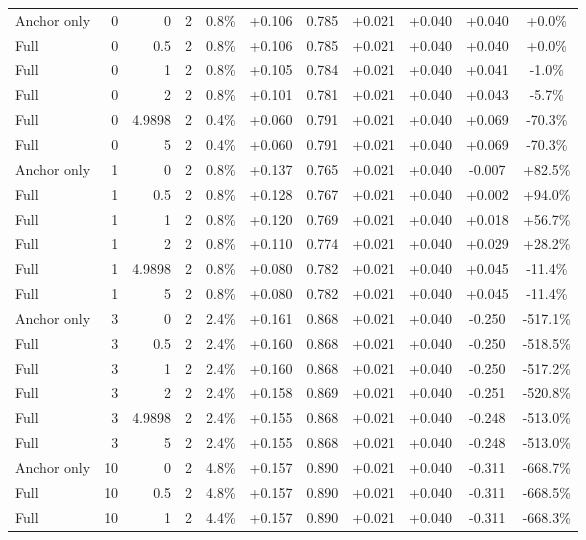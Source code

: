\begin{table}[htbp]
\begin{tabular}{lrrrccccccc}
Anchor only & 0 & 0 & 2 & 0.8\% & +0.106 & 0.785 & +0.021 & +0.040 & +0.040 & +0.0\% \\
Full & 0 & 0.5 & 2 & 0.8\% & +0.106 & 0.785 & +0.021 & +0.040 & +0.040 & +0.0\% \\
Full & 0 & 1 & 2 & 0.8\% & +0.105 & 0.784 & +0.021 & +0.040 & +0.041 & -1.0\% \\
Full & 0 & 2 & 2 & 0.8\% & +0.101 & 0.781 & +0.021 & +0.040 & +0.043 & -5.7\% \\
Full & 0 & 4.9898 & 2 & 0.4\% & +0.060 & 0.791 & +0.021 & +0.040 & +0.069 & -70.3\% \\
Full & 0 & 5 & 2 & 0.4\% & +0.060 & 0.791 & +0.021 & +0.040 & +0.069 & -70.3\% \\
Anchor only & 1 & 0 & 2 & 0.8\% & +0.137 & 0.765 & +0.021 & +0.040 & -0.007 & +82.5\% \\
Full & 1 & 0.5 & 2 & 0.8\% & +0.128 & 0.767 & +0.021 & +0.040 & +0.002 & +94.0\% \\
Full & 1 & 1 & 2 & 0.8\% & +0.120 & 0.769 & +0.021 & +0.040 & +0.018 & +56.7\% \\
Full & 1 & 2 & 2 & 0.8\% & +0.110 & 0.774 & +0.021 & +0.040 & +0.029 & +28.2\% \\
Full & 1 & 4.9898 & 2 & 0.8\% & +0.080 & 0.782 & +0.021 & +0.040 & +0.045 & -11.4\% \\
Full & 1 & 5 & 2 & 0.8\% & +0.080 & 0.782 & +0.021 & +0.040 & +0.045 & -11.4\% \\
Anchor only & 3 & 0 & 2 & 2.4\% & +0.161 & 0.868 & +0.021 & +0.040 & -0.250 & -517.1\% \\
Full & 3 & 0.5 & 2 & 2.4\% & +0.160 & 0.868 & +0.021 & +0.040 & -0.250 & -518.5\% \\
Full & 3 & 1 & 2 & 2.4\% & +0.160 & 0.868 & +0.021 & +0.040 & -0.250 & -517.2\% \\
Full & 3 & 2 & 2 & 2.4\% & +0.158 & 0.869 & +0.021 & +0.040 & -0.251 & -520.8\% \\
Full & 3 & 4.9898 & 2 & 2.4\% & +0.155 & 0.868 & +0.021 & +0.040 & -0.248 & -513.0\% \\
Full & 3 & 5 & 2 & 2.4\% & +0.155 & 0.868 & +0.021 & +0.040 & -0.248 & -513.0\% \\
Anchor only & 10 & 0 & 2 & 4.8\% & +0.157 & 0.890 & +0.021 & +0.040 & -0.311 & -668.7\% \\
Full & 10 & 0.5 & 2 & 4.8\% & +0.157 & 0.890 & +0.021 & +0.040 & -0.311 & -668.5\% \\
Full & 10 & 1 & 2 & 4.4\% & +0.157 & 0.890 & +0.021 & +0.040 & -0.311 & -668.3\% \\

\end{tabular}
\end{table}
